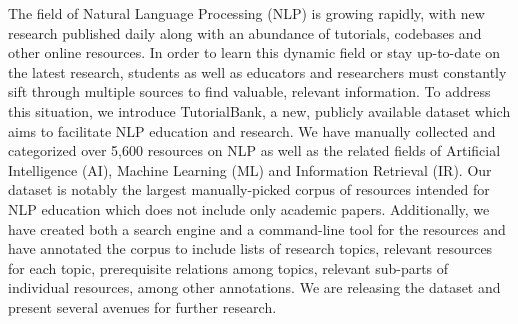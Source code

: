 The field of Natural Language Processing (NLP) is growing rapidly, with new research published daily along with an abundance of tutorials, codebases and other online resources. In order to learn this dynamic field or stay up-to-date on the latest research, students as well as educators and researchers must constantly sift through multiple sources to find valuable, relevant information. To address this situation, we introduce TutorialBank, a new, publicly available dataset which aims to facilitate NLP education and research. We have manually collected and categorized over 5,600 resources on NLP as well as the related fields of Artificial Intelligence (AI), Machine Learning (ML) and Information Retrieval (IR). Our dataset is notably the largest manually-picked corpus of resources intended for NLP education which does not include only academic papers. Additionally, we have created both a search engine and a command-line tool for the resources and have annotated the corpus to include lists of research topics, relevant resources for each topic, prerequisite relations among topics, relevant sub-parts of individual resources, among other annotations. We are releasing the dataset and present several avenues for further research.
